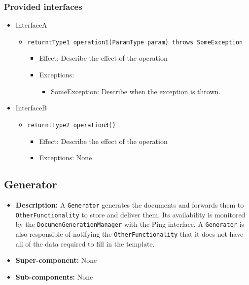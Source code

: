 \documentclass[a4paper,10pt]{article}
\begin{document}
\subsubsection*{Provided interfaces}
\begin{itemize}
    \item InterfaceA
    \begin{itemize}
        \item \texttt{returntType1 operation1(ParamType param) throws SomeException}
        \begin{itemize}
            \item Effect: Describe the effect of the operation
            \item Exceptions:
            \begin{itemize}
                \item SomeException: Describe when the exception is thrown.
            \end{itemize}
        \end{itemize}
    \end{itemize}

    \item InterfaceB
    \begin{itemize}
        \item \texttt{returntType2 operation3()}
        \begin{itemize}
            \item Effect: Describe the effect of the operation
            \item Exceptions: None
        \end{itemize}
    \end{itemize}
\end{itemize}

\subsection{Generator}
\begin{itemize}
    \item \textbf{Description:} A \texttt{Generator} generates the documents and forwards them to \texttt{OtherFunctionality} to store and deliver them. Its availability is monitored by the \texttt{DocumenGenerationManager} with the Ping interface. A \texttt{Generator} is also responsible of notifying the \texttt{OtherFunctionality} that it does not have all of the data required to fill in the template.
    \item \textbf{Super-component:} None
    \item \textbf{Sub-components:} None
\end{itemize}
\end{document}
